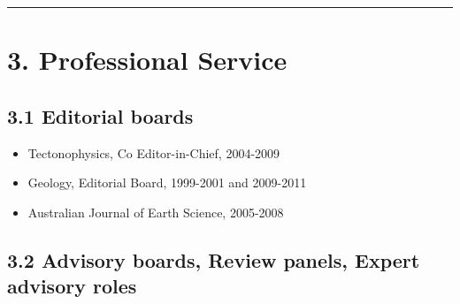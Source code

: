 \documentclass[
]{article}
\providecommand{\tightlist}{%
  \setlength{\itemsep}{0pt}\setlength{\parskip}{0pt}}
\begin{document}
\begin{center}\rule{0.5\linewidth}{0.5pt}\end{center}

\hypertarget{professional-service}{%
\section{3. Professional Service}\label{professional-service}}

\hypertarget{editorial-boards}{%
\subsection{3.1 Editorial boards}\label{editorial-boards}}

\begin{itemize}
\tightlist
\item
  Tectonophysics, Co Editor-in-Chief, 2004-2009
\item
  Geology, Editorial Board, 1999-2001 and 2009-2011
\item
  Australian Journal of Earth Science, 2005-2008
\end{itemize}

\hypertarget{advisory-boards-review-panels-expert-advisory-roles}{%
\subsection{3.2 Advisory boards, Review panels, Expert advisory
roles}\label{advisory-boards-review-panels-expert-advisory-roles}}
\end{document}
